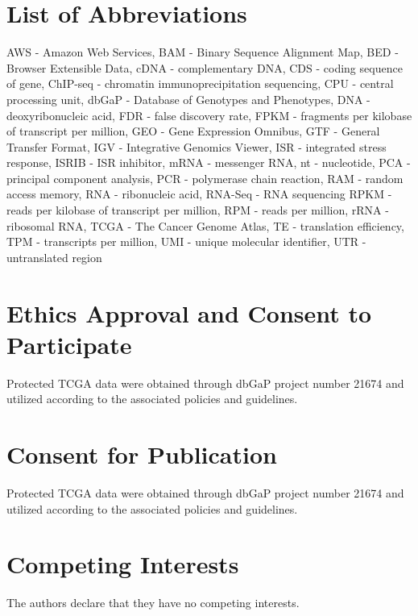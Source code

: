 \documentclass[10pt, oneside]{article}
\begin{document}
\section*{List of Abbreviations}
AWS - Amazon Web Services,
BAM - Binary Sequence Alignment Map,
BED - Browser Extensible Data,
cDNA - complementary DNA,
CDS - coding sequence of gene,
ChIP-seq - chromatin immunoprecipitation sequencing,
CPU - central processing unit,
dbGaP - Database of Genotypes and Phenotypes,
DNA - deoxyribonucleic acid,
FDR - false discovery rate,
FPKM - fragments per kilobase of transcript per million,
GEO - Gene Expression Omnibus,
GTF - General Transfer Format,
IGV - Integrative Genomics Viewer,
ISR - integrated stress response,
ISRIB - ISR inhibitor,
mRNA - messenger RNA,
nt - nucleotide,
PCA - principal component analysis,
PCR - polymerase chain reaction,
RAM - random access memory,
RNA - ribonucleic acid,
RNA-Seq - RNA sequencing
RPKM - reads per kilobase of transcript per million,
RPM - reads per million,
rRNA - ribosomal RNA,
TCGA - The Cancer Genome Atlas,
TE - translation efficiency,
TPM - transcripts per million,
UMI - unique molecular identifier,
UTR - untranslated region\\

\section*{Ethics Approval and Consent to Participate}
Protected TCGA data were obtained through dbGaP project number 21674 and utilized according to the associated policies and guidelines.\\

\section*{Consent for Publication}
Protected TCGA data were obtained through dbGaP project number 21674 and utilized according to the associated policies and guidelines.\\

\section*{Competing Interests}
The authors declare that they have no competing interests.\\
\end{document}
